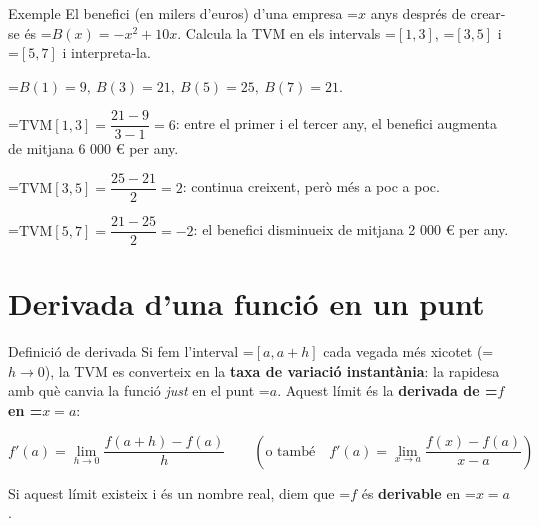 \documentclass[11pt,a4paper]{article}
\newcommand{\fmm}[1]{\setbox0=\hbox{$#1$}\ifdim\wd0>\linewidth\[#1\]\else\mbox{\box0}\fi}
\begin{document}
  
\begin{fmex}{Exemple}
El benefici (en milers d'euros) d'una empresa \fmm{x} anys després de crear-se és \fmm{B(x)=-x^2+10x}. Calcula la TVM en els intervals \fmm{[1,3]}, \fmm{[3,5]} i \fmm{[5,7]} i interpreta-la.

 \vspace*{0.2cm}

        

\fmm{B(1)=9,\ B(3)=21,\ B(5)=25,\ B(7)=21}.

  
  \vspace*{0.2cm}      

\fmm{\text{TVM}[1,3]=\dfrac{21-9}{3-1}=6}: entre el primer i el tercer any, el benefici augmenta de mitjana 6 000 € per any.

\vspace*{0.2cm}
        

\fmm{\text{TVM}[3,5]=\dfrac{25-21}{2}=2}: continua creixent, però més a poc a poc.

        
        \vspace*{0.2cm}

\fmm{\text{TVM}[5,7]=\dfrac{21-25}{2}=-2}: el benefici disminueix de mitjana 2 000 € per any.
\end{fmex}

  
\section{Derivada d'una funció en un punt}\hypertarget{sec2}{}

  

  
\begin{fmdef}{Definició de derivada}
Si fem l'interval \fmm{[a,a+h]} cada vegada més xicotet (\fmm{h\to0}), la TVM es converteix en la \textbf{taxa de variació instantània}: la rapidesa amb què canvia la funció \emph{just} en el punt \fmm{a}. Aquest límit és la \textbf{derivada de \fmm{f} en \fmm{x=a}}:

      
\[f'(a)=\lim_{h\to0}\frac{f(a+h)-f(a)}{h}\qquad\left(\text{o també}\quad f'(a)=\lim_{x\to a}\frac{f(x)-f(a)}{x-a}\right)\]

      

Si aquest límit existeix i és un nombre real, diem que \fmm{f} és \textbf{derivable} en \fmm{x=a}.
\end{fmdef}
\end{document}

